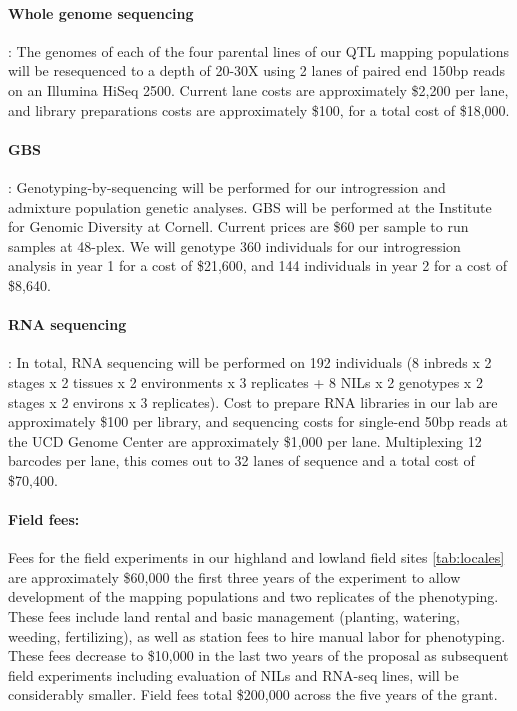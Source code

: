 \paragraph{Whole genome sequencing}:
The genomes of each of the four parental lines of our QTL mapping populations will be resequenced to a depth of 20-30X using 2 lanes of paired end 150bp reads on an Illumina HiSeq 2500. Current lane costs are approximately \$2,200 per lane, and library preparations costs are approximately \$100, for a total cost of \$18,000.

\paragraph{GBS}:
Genotyping-by-sequencing will be performed for our introgression and admixture population genetic analyses. GBS will be performed at the Institute for Genomic Diversity at Cornell.  Current prices are \$60 per sample to run samples at 48-plex.  We will genotype 360 individuals for our introgression analysis in year 1 for a cost of \$21,600, and 144 individuals in year 2 for a cost of \$8,640. 

\paragraph{RNA sequencing}:
In total, RNA sequencing will be performed on 192 individuals (8 inbreds x 2 stages x 2 tissues x 2 environments x 3 replicates + 8 NILs x 2 genotypes x 2 stages x 2 environs x 3 replicates).  Cost to prepare RNA libraries in our lab are approximately \$100 per library, and sequencing costs for single-end 50bp reads at the UCD Genome Center are approximately \$1,000 per lane.  Multiplexing 12 barcodes per lane, this comes out to 32 lanes of sequence and a total cost of \$70,400.

\paragraph{Field fees:}
Fees for the field experiments in our highland and lowland field sites \ref{tab:locales} are approximately \$60,000 the first three years of the experiment to allow development of the mapping populations and two replicates of the phenotyping.  These fees include land rental and basic management (planting, watering, weeding, fertilizing), as well as station fees to hire manual labor for phenotyping.  These fees decrease to \$10,000 in the last two years of the proposal as subsequent field experiments including evaluation of NILs and RNA-seq lines, will be considerably smaller. Field fees total \$200,000 across the five years of the grant.

